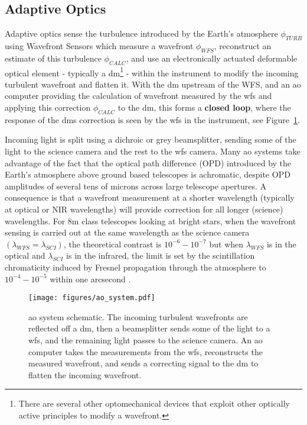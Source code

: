 \documentclass[letterpaper]{ar-1col}
\newcommand{\acc}[1]{\entry{\acs{#1}}{\acl{#1}}}
\begin{document}
\subsection{Adaptive Optics}

Adaptive optics sense the turbulence introduced by the Earth's atmosphere $\phi_{TURB}$ using Wavefront Sensors which measure a wavefront $\phi_{WFS}$, reconstruct an estimate of this turbulence $\phi_{CALC}$, and use an electronically actuated deformable optical element - typically a \ac{dm}\footnote{There are several other optomechanical devices that exploit other optically active principles to modify a wavefront.} - within the instrument to modify the incoming turbulent wavefront and flatten it.
%
With the \ac{dm} upstream of the WFS, and an \ac{ao} computer providing the calculation of wavefront measured by the \ac{wfs} and applying this correction $\phi_{CALC}$ to the \ac{dm}, this forms a {\bf closed loop}, where the response of the \acp{dm} correction is seen by the \ac{wfs} in the instrument, see Figure~\ref{fig:aosystem}.

\begin{armarginnote}[]
\acc{dm}
\acc{fpm}
\acc{ppm}
\acc{wfs}
\acc{ao}
\end{armarginnote}

Incoming light is split using a dichroic or grey beamsplitter, sending some of the light to the science camera and the rest to the \ac{wfs} camera.
%
Many \ac{ao} systems take advantage of the fact that the optical path difference (OPD) introduced by the Earth's atmosphere above ground based telescopes is achromatic, despite OPD amplitudes of several tens of microns across large telescope apertures.
%
A consequence is that a wavefront measurement at a shorter wavelength (typically at optical or NIR wavelengths) will provide correction for all longer (science) wavelengths.
%
For 8m class telescopes looking at bright stars, when the wavefront sensing is carried out at the same wavelength as the science camera $(\lambda_{WFS}=\lambda_{SCI})$, the theoretical contrast is $10^{-6}-10^{-7}$ but when $\lambda_{WFS}$ is in the optical and $\lambda_{SCI}$ is in the infrared, the limit is set by the scintillation chromaticity induced by Fresnel propagation through the atmosphere to $10^{-4}-10^{-5}$ within one arcsecond \citep[see ][ for a discussion of the limits to \ac{ao} for HCI]{Guyon05-1}.

\begin{figure}[!ht]
\centering
\texttt{[image: figures/ao\_system.pdf]}
 \caption{\ac{ao} system schematic.
 The incoming turbulent wavefronts are reflected off a \ac{dm}, then a beamsplitter sends some of the light to a \ac{wfs}, and the remaining light passes to the science camera.
 An \ac{ao} computer takes the measurements from the \ac{wfs}, reconstructs the measured wavefront, and sends a correcting signal to the \ac{dm} to flatten the incoming wavefront.}
  \label{fig:aosystem}
\end{figure}
\end{document}
